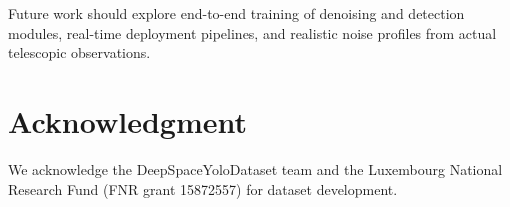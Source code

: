 \documentclass[12pt, conference]{IEEEtran}
\begin{document}
Future work should explore end-to-end training of denoising and detection modules, real-time deployment pipelines, and realistic noise profiles from actual telescopic observations.

\section*{Acknowledgment}
We acknowledge the DeepSpaceYoloDataset team and the Luxembourg National Research Fund (FNR grant 15872557) for dataset development.

\nocite{*} %


\end{document}

